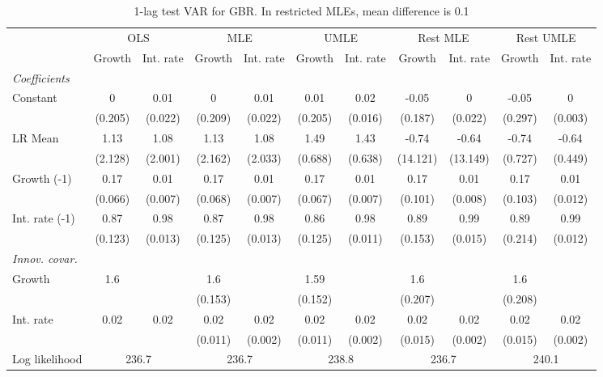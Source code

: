 \begin{table}[htbp] 
	\centering
	\begin{tabular}{@{\extracolsep{4pt}}lcccccccccc@{}}		\hline\hline
		 		 & \multicolumn{2}{c}{OLS} &\multicolumn{2}{c}{MLE} &\multicolumn{2}{c}{UMLE} &\multicolumn{2}{c}{Rest MLE} &\multicolumn{2}{c}{Rest UMLE} \\ 
 		 & Growth 	 & Int. rate 	 & Growth 	 & Int. rate 	 & Growth 	 & Int. rate 	 & Growth 	 & Int. rate 	 & Growth 	 & Int. rate\\\cline{2-3}\cline{4-5}\cline{6-7}\cline{8-9}\cline{10-11}
\rule{0pt}{4ex} 
 \emph{Coefficients} 	  		 & 		 & 		 & 		 & 		 & 		 & 		 & 		 & 		 & 		 &\\ 
\quad Constant 	 & 0 	 & 0.01 	 & 0 	 & 0.01 	 & 0.01 	 & 0.02 	 & -0.05 	 & 0 	 & -0.05 	 & 0	 \\ 
 		 & (0.205) 	 & (0.022) 	 & (0.209) 	 & (0.022) 	 & (0.205) 	 & (0.016) 	 & (0.187) 	 & (0.022) 	 & (0.297) 	 & (0.003) 	 \\ 
\quad LR Mean 	 & 1.13 	 & 1.08 	 & 1.13 	 & 1.08 	 & 1.49 	 & 1.43 	 & -0.74 	 & -0.64 	 & -0.74 	 & -0.64	 \\ 
 		 & (2.128) 	 & (2.001) 	 & (2.162) 	 & (2.033) 	 & (0.688) 	 & (0.638) 	 & (14.121) 	 & (13.149) 	 & (0.727) 	 & (0.449) 	 \\ 
\quad Growth (-1) 	 &0.17 	 & 0.01 	 & 0.17 	 & 0.01 	 & 0.17 	 & 0.01 	 & 0.17 	 & 0.01 	 & 0.17 	 & 0.01	 \\ 
 		 & (0.066) 	 & (0.007) 	 & (0.068) 	 & (0.007) 	 & (0.067) 	 & (0.007) 	 & (0.101) 	 & (0.008) 	 & (0.103) 	 & (0.012) 	 \\ 
\quad Int. rate (-1) 	 &0.87 	 & 0.98 	 & 0.87 	 & 0.98 	 & 0.86 	 & 0.98 	 & 0.89 	 & 0.99 	 & 0.89 	 & 0.99	 \\ 
 		 & (0.123) 	 & (0.013) 	 & (0.125) 	 & (0.013) 	 & (0.125) 	 & (0.011) 	 & (0.153) 	 & (0.015) 	 & (0.214) 	 & (0.012) 	 \\ 
\rule{0pt}{4ex} \emph{Innov. covar.}  	 & 	 & 	 & 	 & 	 & 	 & 	 & 	 & 	 & 	 &\\ 
\quad Growth 	 &1.6 	 &  	 & 1.6 	 &  	 & 1.59 	 &  	 & 1.6 	 &  	 & 1.6 	 & 	 \\ 
 		 &  	 &  	 & (0.153) 	 &  	 & (0.152) 	 &  	 & (0.207) 	 &  	 & (0.208) 	 &  	 \\ 
\quad Int. rate 	 &0.02 	 & 0.02 	 & 0.02 	 & 0.02 	 & 0.02 	 & 0.02 	 & 0.02 	 & 0.02 	 & 0.02 	 & 0.02	 \\ 
 		 &  	 &  	 & (0.011) 	 & (0.002) 	 & (0.011) 	 & (0.002) 	 & (0.015) 	 & (0.002) 	 & (0.015) 	 & (0.002) 	 \\ 
 \hline \rule{0pt}{4ex} 
  Log likelihood 	 &\multicolumn{2}{c}{236.7} 	 & \multicolumn{2}{c}{236.7} 	 & \multicolumn{2}{c}{238.8} 	 & \multicolumn{2}{c}{236.7} 	 & \multicolumn{2}{c}{240.1}\\ 

 \hline 	\end{tabular}		\caption{1-lag test VAR for GBR. In restricted MLEs, mean difference is 0.1}
		\label{tab:GBR1lag}

\end{table}